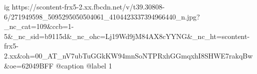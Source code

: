  
 
 
 
 

\ifcmt
  ig https://scontent-frx5-2.xx.fbcdn.net/v/t39.30808-6/271949598_5095295050504061_4104423337394966440_n.jpg?_nc_cat=109&ccb=1-5&_nc_sid=b9115d&_nc_ohc=Lj19Wd9jM84AX8cYYNG&_nc_ht=scontent-frx5-2.xx&oh=00_AT_nV7ubTuGGkKW94mnSoNTPRxhGGmqxhI8SHWE7rakqBw&oe=62049BFF
  @caption @label 1
\fi
